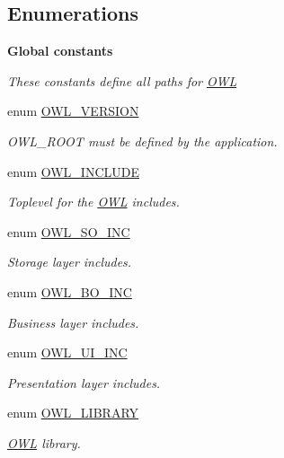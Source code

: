 \subsection*{Enumerations}
\begin{Indent}{\bf Global constants}\par
{\em \label{_amgrp08b298bc013f410cd1f593c409434f9b}
 These constants define all paths for \hyperlink{classOWL}{OWL} }\begin{DoxyCompactItemize}
\item 
enum \hyperlink{OWLloader_8php_ab34b15a08db8691330db97cccd4d6140}{OWL\_\-VERSION} 
\begin{DoxyCompactList}\small\item\em OWL\_\-ROOT must be defined by the application. \item\end{DoxyCompactList}\item 
enum \hyperlink{OWLloader_8php_a4d33a8f2fcc9c83cbeea921c4cb23a7f}{OWL\_\-INCLUDE} 
\begin{DoxyCompactList}\small\item\em Toplevel for the \hyperlink{classOWL}{OWL} includes. \item\end{DoxyCompactList}\item 
enum \hyperlink{OWLloader_8php_a75dffdef5ba58a0ba5f21ed40627897f}{OWL\_\-SO\_\-INC} 
\begin{DoxyCompactList}\small\item\em Storage layer includes. \item\end{DoxyCompactList}\item 
enum \hyperlink{OWLloader_8php_aca50646bc73c3addf0e0f25081eae0ae}{OWL\_\-BO\_\-INC} 
\begin{DoxyCompactList}\small\item\em Business layer includes. \item\end{DoxyCompactList}\item 
enum \hyperlink{OWLloader_8php_a2e11101c70f011a91d0d9c7f8e217738}{OWL\_\-UI\_\-INC} 
\begin{DoxyCompactList}\small\item\em Presentation layer includes. \item\end{DoxyCompactList}\item 
enum \hyperlink{OWLloader_8php_a74eed08508c8b70677c4167acf49e427}{OWL\_\-LIBRARY} 
\begin{DoxyCompactList}\small\item\em \hyperlink{classOWL}{OWL} library. \item\end{DoxyCompactList}\item 

\end{DoxyCompactItemize}
\end{Indent}
